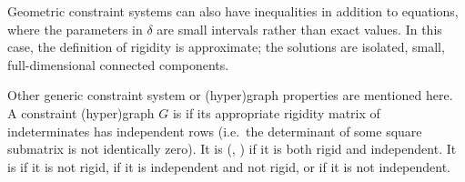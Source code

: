 Geometric constraint systems can also have inequalities in addition to equations, where the parameters in $\delta$ are small intervals rather than exact values. In this case, the definition of rigidity is approximate; the solutions are isolated, small, full-dimensional connected components.

Other generic constraint system or (hyper)graph properties are mentioned here.
A constraint (hyper)graph $G$ is  if its appropriate rigidity matrix of indeterminates has independent rows (i.e.\ the determinant of some square submatrix is not identically zero).
It is  (, ) if it is both rigid and independent.
It is  if it is not rigid,  if it is independent and not rigid, or  if it is not independent.


